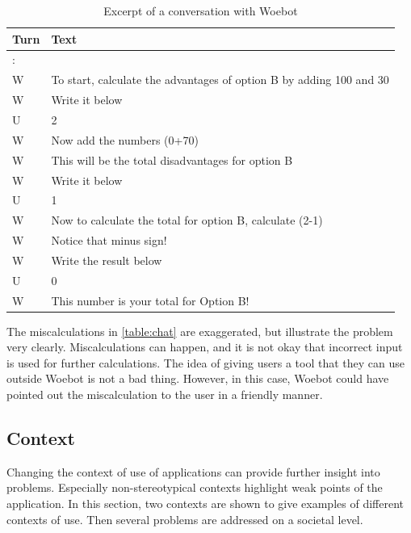 \begin{table}[ht]
    \begin{tabularx}{\columnwidth}{l X}
        \hline
        Turn & Text                                                                \\
        \hline
        :    &                                                                     \\
        W    & To start, calculate the advantages of option B by adding 100 and 30 \\
        W    & Write it below                                                      \\
        U    & 2                                                                   \\
        W    & Now add the numbers (0+70)                                          \\
        W    & This will be the total disadvantages for option B                   \\
        W    & Write it below                                                      \\
        U    & 1                                                                   \\
        W    & Now to calculate the total for option B, calculate (2-1)            \\
        W    & Notice that minus sign!                                             \\
        W    & Write the result below                                              \\
        U    & 0                                                                   \\
        W    & This number is your total for Option B!                             \\
    \end{tabularx}
    \caption{Excerpt of a conversation with Woebot}
    \label{table:chat}
\end{table}

The miscalculations in \autoref{table:chat} are exaggerated, but illustrate the problem very clearly.
Miscalculations can happen, and it is not okay that incorrect input is used for further calculations.
The idea of giving users a tool that they can use outside Woebot is not a bad thing.
However, in this case, Woebot could have pointed out the miscalculation to the user in a friendly manner.

\subsection{Context}
Changing the context of use of applications can provide further insight into problems.
Especially non-stereotypical contexts highlight weak points of the application.
In this section, two contexts are shown to give examples of different contexts of use.
Then several problems are addressed on a societal level.

